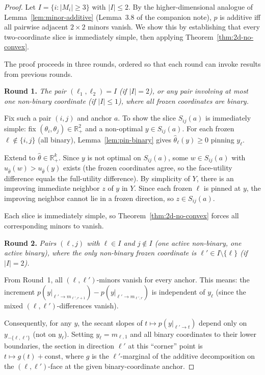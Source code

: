 \documentclass[11pt]{article}
\newcommand{\R}{\mathbb{R}}
\newcommand{\Rp}{\R_+}
\begin{document}
\begin{proof}
Let $I = \{i : |M_i| \geq 3\}$ with $|I| \leq 2$.  By the
higher-dimensional analogue of Lemma~\ref{lem:minor-additive}
(Lemma~3.8 of the companion note), $p$ is additive iff all pairwise
adjacent $2 \times 2$ minors vanish.  We show this by establishing
that every two-coordinate slice is immediately simple, then applying
Theorem~\ref{thm:2d-no-convex}.

The proof proceeds in three rounds, ordered so that each round can
invoke results from previous rounds.

\medskip\noindent
\textbf{Round 1.}  \emph{The pair $(\ell_1, \ell_2) = I$ (if $|I| = 2$),
or any pair involving at most one non-binary coordinate (if $|I| \leq 1$),
where all frozen coordinates are binary.}

Fix such a pair $(i,j)$ and anchor $a$.  To show the slice $S_{ij}(a)$
is immediately simple: fix $(\theta_i, \theta_j) \in \Rp^2$ and a
non-optimal $y \in S_{ij}(a)$.  For each frozen $\ell \notin \{i,j\}$
(all binary), Lemma~\ref{lem:pin-binary} gives $\hat\theta_\ell(y) \geq 0$
pinning $y_\ell$.

Extend to $\hat\theta \in \Rp^k$.  Since $y$ is not optimal on
$S_{ij}(a)$, some $w \in S_{ij}(a)$ with $u_{\hat\theta}(w) > u_{\hat\theta}(y)$
exists (the frozen coordinates agree, so the face-utility difference
equals the full-utility difference).  By simplicity of $Y$, there is
an improving immediate neighbor $z$ of $y$ in $Y$.  Since each frozen
$\ell$ is pinned at $y$, the improving neighbor cannot lie in a frozen
direction, so $z \in S_{ij}(a)$.

Each slice is immediately simple, so Theorem~\ref{thm:2d-no-convex}
forces all corresponding minors to vanish.

\medskip\noindent
\textbf{Round 2.}  \emph{Pairs $(\ell, j)$ with $\ell \in I$ and $j \notin I$
(one active non-binary, one active binary), where the only non-binary
frozen coordinate is $\ell' \in I \setminus \{\ell\}$ (if $|I| = 2$).}

From Round~1, all $(\ell, \ell')$-minors vanish for every anchor.
This means: the increment $p(y|_{\ell' \to m_{\ell',r+1}}) -
p(y|_{\ell' \to m_{\ell',r}})$ is independent of $y_\ell$ (since
the mixed $(\ell, \ell')$-differences vanish).

Consequently, for any $y$, the secant slopes of
$t \mapsto p(y|_{\ell' \to t})$ depend only on
$y_{-\{\ell, \ell'\}}$ (not on $y_\ell$).  Setting $y_\ell = m_{\ell,1}$
and all binary coordinates to their lower boundaries, the section
in direction $\ell'$ at this ``corner'' point is
$t \mapsto g(t) + \text{const}$, where $g$ is the $\ell'$-marginal of
the additive decomposition on the $(\ell, \ell')$-face at the given
binary-coordinate anchor.


\end{proof}
\end{document}
